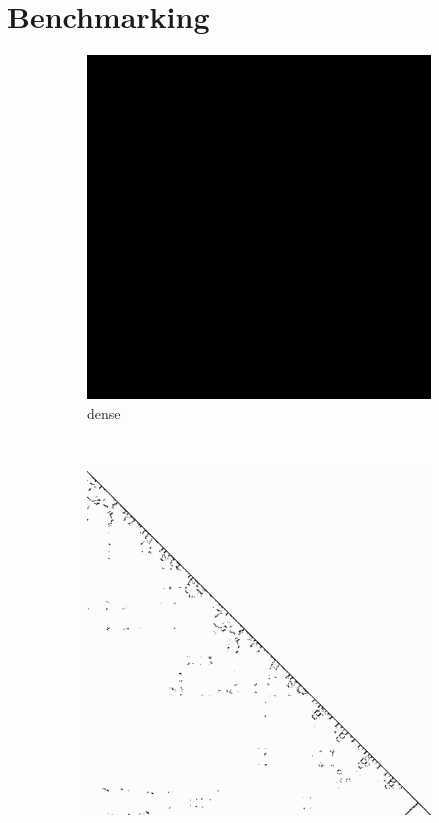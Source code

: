 \section{Benchmarking}
\label{sec:benchmarking}
\begin{figure}
\begin{multicols}{4}
\begin{subfigure}{\linewidth}
\includegraphics[width=\linewidth]{images/dense}
\caption{dense}
\end{subfigure}~%
\begin{subfigure}{\linewidth}
\includegraphics[width=\linewidth]{images/pdb1HYS}

\end{subfigure}
\end{multicols}
\end{figure}
